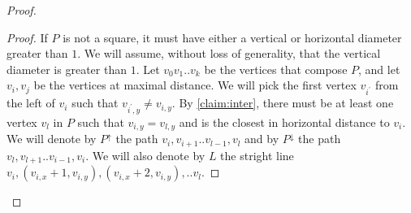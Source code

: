\begin{proof}
  \begin{proof} 
%
If $P$ is not a square, it must have either a vertical or horizontal diameter greater than $1$. We will assume, without loss of generality, that the vertical diameter is greater than $1$. Let $v_{0}v_{1}..v_{k}$ be the vertices that compose $P$, and let $v_{i},v_{j}$ be the vertices at maximal distance. We will pick the first vertex $v_{i^\prime}$ from the left of $v_{i}$ such that $v_{i^\prime , y} \neq v_{i,y}$. By \cref{claim:inter}, there must be at least one vertex $v_{l}$ in $P$ such that $v_{i,y} = v_{l,y}$ and is the closest in horizontal distance to $v_{i}$. We will denote by $P^{\uparrow}$ the path $v_{i},v_{i+1}..v_{l-1},v_{l}$ and by $P^{\downarrow}$ the path $v_{l},v_{l+1}..v_{i-1},v_{i}$. We will also denote by $L$ the stright line $v_{i},\left( v_{i,x}+1, v_{i,y} \right), \left( v_{i,x}+2, v_{i,y} \right), .. v_{l}$. 


\end{proof}
\end{proof}
